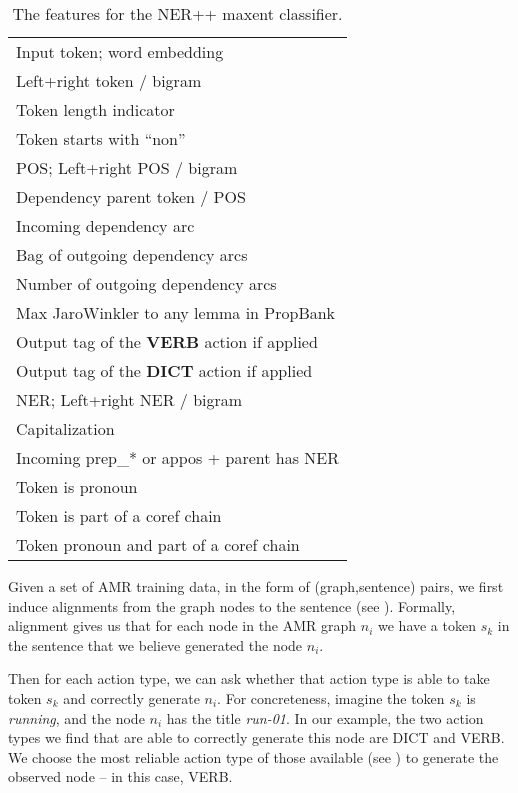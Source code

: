 \documentclass[11pt]{article}
\newcommand\w[1]{\textit{#1}} %
\newcommand\n[1]{\textit{#1}} %
\begin{document}
\begin{table}[t]
\small
\begin{center}
\begin{tabular}{l}
Input token; word embedding                  \\
Left+right token / bigram                    \\
Token length indicator     \\
Token starts with ``non''     \\
POS; Left+right POS / bigram                 \\
Dependency parent token / POS                \\
Incoming dependency arc                      \\
Bag of outgoing dependency arcs              \\
Number of outgoing dependency arcs           \\
Max JaroWinkler to any lemma in PropBank      \\
Output tag of the \textbf{VERB} action if applied \\
Output tag of the \textbf{DICT} action if applied \\
NER; Left+right NER / bigram                 \\
Capitalization                               \\
Incoming prep\_* or appos + parent has NER   \\
Token is pronoun                             \\
Token is part of a coref chain               \\
Token pronoun and part of a coref chain     \\
\end{tabular}
\end{center}
\caption{\label{tab:features} The features for the NER++ maxent classifier. }
\end{table}

Given a set of AMR training data, in the form of (graph,sentence) pairs,
  we first induce alignments from the graph nodes to the sentence 
  (see ).
Formally, alignment gives us that for each node in the AMR graph $n_i$ we have a token $s_k$ in the
  sentence that we believe generated the node $n_i$.

Then for each action type, we can ask whether that action type is able to take 
  token $s_k$ and correctly generate $n_i$. 
For concreteness, imagine the token $s_k$ is \w{running}, and the node $n_i$ has 
  the title \n{run-01}.
In our example, the two action types we find that are 
  able to correctly generate this node are DICT and VERB. 
We choose the most reliable action type of those available (see )
  to generate the observed node -- in this case, VERB.
  
\end{document}
